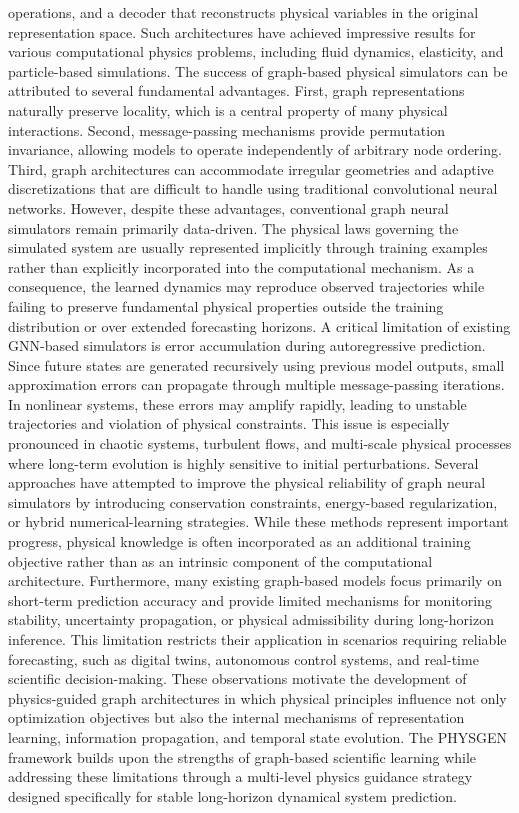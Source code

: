 operations, and a decoder that reconstructs physical variables in the original representation space. Such architectures have achieved impressive results for various computational physics problems, including fluid dynamics, elasticity, and particle-based simulations. The success of graph-based physical simulators can be attributed to several fundamental advantages. First, graph representations naturally preserve locality, which is a central property of many physical interactions. Second, message-passing mechanisms provide permutation invariance, allowing models to operate independently of arbitrary node ordering. Third, graph architectures can accommodate irregular geometries and adaptive discretizations that are difficult to handle using traditional convolutional neural networks. However, despite these advantages, conventional graph neural simulators remain primarily data-driven. The physical laws governing the simulated system are usually represented implicitly through training examples rather than explicitly incorporated into the computational mechanism. As a consequence, the learned dynamics may reproduce observed trajectories while failing to preserve fundamental physical properties outside the training distribution or over extended forecasting horizons. A critical limitation of existing GNN-based simulators is error accumulation during autoregressive prediction. Since future states are generated recursively using previous model outputs, small approximation errors can propagate through multiple message-passing iterations. In nonlinear systems, these errors may amplify rapidly, leading to unstable trajectories and violation of physical constraints. This issue is especially pronounced in chaotic systems, turbulent flows, and multi-scale physical processes where long-term evolution is highly sensitive to initial perturbations. Several approaches have attempted to improve the physical reliability of graph neural simulators by introducing conservation constraints, energy-based regularization, or hybrid numerical-learning strategies. While these methods represent important progress, physical knowledge is often incorporated as an additional training objective rather than as an intrinsic component of the computational architecture. Furthermore, many existing graph-based models focus primarily on short-term prediction accuracy and provide limited mechanisms for monitoring stability, uncertainty propagation, or physical admissibility during long-horizon inference. This limitation restricts their application in scenarios requiring reliable forecasting, such as digital twins, autonomous control systems, and real-time scientific decision-making. These observations motivate the development of physics-guided graph architectures in which physical principles influence not only optimization objectives but also the internal mechanisms of representation learning, information propagation, and temporal state evolution. The PHYSGEN framework builds upon the strengths of graph-based scientific learning while addressing these limitations through a multi-level physics guidance strategy designed specifically for stable long-horizon dynamical system prediction. \] 

